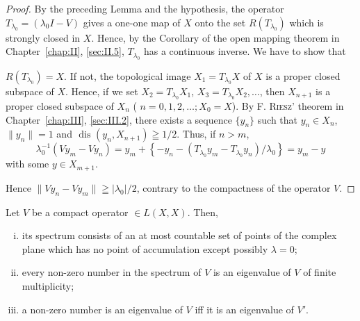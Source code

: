 \begin{proof}
 By the preceding Lemma and the hypothesis, the operator $T_{\lambda_{0}} = (\lambda_{0}I - V)$ gives a one-one map of $X$ onto the set $R(T_{\lambda_{0}})$ which is strongly closed in $X$. Hence, by the Corollary of the open mapping theorem in Chapter~\ref{chap:II}, \ref{sec:II.5}, $T_{\lambda_{0}}$ has a continuous inverse. We have to show that 

$R(T_{\lambda_0}) = X$. If not, the topological image $X_1 = T_{\lambda_0}X$ of $X$ is a proper closed subspace of $X$. Hence, if we set $X_2 = T_{\lambda_0}X_1$, $X_3 = T_{\lambda_0}X_2, \ldots$, then $X_{n+1}$ is a proper closed subspace of $X_n$ ( $n = 0, 1, 2, \ldots; X_0 = X$). By F. \textsc{Riesz}' theorem in Chapter~\ref{chap:III}, \ref{sec:III.2}, there exists a sequence $\{y_n\}$ such that $y_n \in X_n$, $\|y_n\| = 1$ and $\text{ dis }(y_n, X_{n+1}) \geqq 1/2$. Thus, if $n > m$, 
\[
\lambda_{0} ^{-1} \left(V y _{m} - V y _{n}\right) = y _{m} + \left\{- y _{n} - \left(T _ {\lambda_{0}} y _{m} - T _ {\lambda_{0}} y _{n}\right) / \lambda_{0} \right\} = y _{m} - y
\]
with some $y \in X_{m+1}$. 

Hence $\|Vy_n - Vy_m\| \geqq |\lambda_0| / 2$, contrary to the compactness of the operator $V$. 
\end{proof}

\begin{theorem}\label{thm:X.5.Theorem.2} Let $V$ be a compact operator $\in L(X, X)$. Then, \begin{enumerate}[(i)]
\item its spectrum consists of an at most countable set of points of the complex plane which has no point of accumulation except possibly $\lambda = 0$;
\item every non-zero number in the spectrum of $V$ is an eigenvalue of $V$ of finite multiplicity;
\item a non-zero number is an eigenvalue of $V$ iff it is an eigenvalue of $V'$.
\end{enumerate}
\end{theorem}

